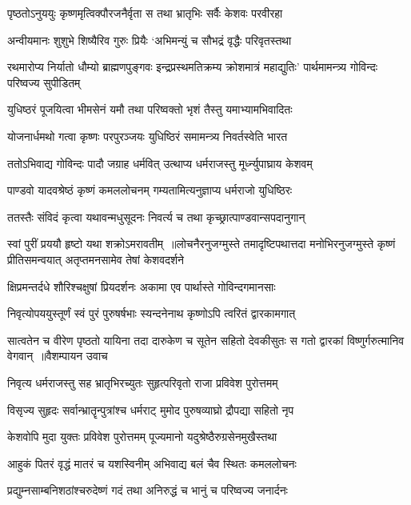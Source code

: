 \twolineshloka
{पृष्ठतोऽनुययुः कृष्णमृत्विक्पौरजनैर्वृता}
{स तथा भ्रातृभिः सर्वैः केशवः परवीरहा}


\twolineshloka
{अन्वीयमानः शुशुभे शिष्यैरिव गुरुः प्रियैः}
{`अभिमन्युं च सौभद्रं वृद्धैः परिवृतस्तथा}


\threelineshloka
{रथमारोप्य निर्यातो धौम्यो ब्राह्मणपुङ्गवः}
{इन्द्रप्रस्थमतिक्रम्य क्रोशमात्रं महाद्युतिः'}
{पार्थमामन्त्र्य गोविन्दः परिष्वज्य सुपीडितम्}


\twolineshloka
{युधिष्ठरं पूजयित्वा भीमसेनं यमौ तथा}
{परिष्वक्तो भृशं तैस्तु यमाभ्यामभिवादितः}


\twolineshloka
{योजनार्धमथो गत्वा कृष्णः परपुरञ्जयः}
{युधिष्ठिरं समामन्त्र्य निवर्तस्वेति भारत}


\twolineshloka
{ततोऽभिवाद्य गोविन्दः पादौ जग्राह धर्मवित्}
{उत्थाप्य धर्मराजस्तु मूर्ध्न्युपाघ्राय केशवम्}


\twolineshloka
{पाण्डवो यादवश्रेष्ठं कृष्णं कमललोचनम्}
{गम्यतामित्यनुज्ञाप्य धर्मराजो युधिष्ठिरः}


\twolineshloka
{ततस्तैः संविदं कृत्वा यथावन्मधुसूदनः}
{निवर्त्य च तथा कृच्छ्रात्पाण्डवान्सपदानुगान्}


स्वां पुरीं प्रययौ हृष्टो यथा शक्रोऽमरावतीम् ॥लोचनैरनुजग्मुस्ते तमादृष्टिपथात्तदा
\twolineshloka
{मनोभिरनुजग्मुस्ते कृष्णं प्रीतिसमन्वयात्}
{अतृप्तमनसामेव तेषां केशवदर्शने}


\twolineshloka
{क्षिप्रमन्तर्दधे शौरिश्चक्षुषां प्रियदर्शनः}
{अकामा एव पार्थास्ते गोविन्दगमानसाः}


\twolineshloka
{निवृत्योपययुस्तूर्णं स्वं पुरं पुरुषर्षभाः}
{स्यन्दनेनाथ कृष्णोऽपि त्वरितं द्वारकामगात्}


\fourlineindentedshloka
{सात्वतेन च वीरेण पृष्ठतो यायिना तदा}
{दारुकेण च सूतेन सहितो देवकीसुतः}
{स गतो द्वारकां विष्णुर्गरुत्मानिव वेगवान् ॥वैशम्पायन उवाच}
{}


\twolineshloka
{निवृत्य धर्मराजस्तु सह भ्रातृभिरच्युतः}
{सुहृत्परिवृतो राजा प्रविवेश पुरोत्तमम्}


\twolineshloka
{विसृज्य सुहृदः सर्वान्भ्रातॄन्पुत्रांश्च धर्मराट्}
{मुमोद पुरुषव्याघ्रो द्रौपद्या सहितो नृप}


\twolineshloka
{केशवोपि मुदा युक्तः प्रविवेश पुरोत्तमम्}
{पूज्यमानो यदुश्रेष्ठैरुग्रसेनमुखैस्तथा}


\twolineshloka
{आहुकं पितरं वृद्धं मातरं च यशस्विनीम्}
{अभिवाद्य बलं चैव स्थितः कमललोचनः}


\twolineshloka
{प्रद्युम्नसाम्बनिशठांश्चरुदेष्णं गदं तथा}
{अनिरुद्धं च भानुं च परिष्वज्य जनार्दनः}


